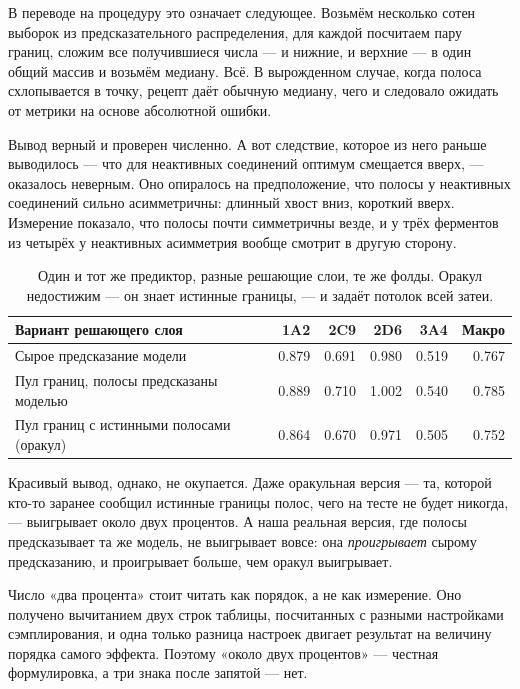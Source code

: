 В переводе на процедуру это означает следующее. Возьмём несколько сотен выборок из
предсказательного распределения, для каждой посчитаем пару границ, сложим все получившиеся
числа --- и нижние, и верхние --- в один общий массив и возьмём медиану. Всё. В вырожденном
случае, когда полоса схлопывается в точку, рецепт даёт обычную медиану, чего и следовало
ожидать от метрики на основе абсолютной ошибки.

Вывод верный и проверен численно. А вот следствие, которое из него раньше выводилось --- что
для неактивных соединений оптимум смещается вверх, --- оказалось неверным. Оно опиралось на
предположение, что полосы у неактивных соединений сильно асимметричны: длинный хвост вниз,
короткий вверх. Измерение показало, что полосы почти симметричны везде, и у трёх ферментов из
четырёх у неактивных асимметрия вообще смотрит в другую сторону.

\begin{table}[htbp]\centering\small
\begin{tabularx}{0.88\textwidth}{@{}Xrrrrr@{}}
\toprule
Вариант решающего слоя & 1A2 & 2C9 & 2D6 & 3A4 & Макро \\
\midrule
Сырое предсказание модели & 0.879 & 0.691 & 0.980 & 0.519 & 0.767 \\
Пул границ, полосы предсказаны моделью & 0.889 & 0.710 & 1.002 & 0.540 & 0.785 \\
Пул границ с истинными полосами (оракул) & 0.864 & 0.670 & 0.971 & 0.505 & 0.752 \\
\bottomrule
\end{tabularx}
\caption{Один и тот же предиктор, разные решающие слои, те же фолды. Оракул недостижим --- он
знает истинные границы, --- и задаёт потолок всей затеи.}
\label{tab:decision}
\end{table}

Красивый вывод, однако, не окупается. Даже оракульная версия --- та, которой
кто-то заранее сообщил истинные границы полос, чего на тесте не будет никогда, --- выигрывает
около двух процентов. А наша реальная версия, где полосы предсказывает та же модель, не
выигрывает вовсе: она \emph{проигрывает} сырому предсказанию, и проигрывает больше, чем оракул
выигрывает.

Число «два процента» стоит читать как порядок, а не как измерение. Оно получено вычитанием двух
строк таблицы, посчитанных с разными настройками сэмплирования, и одна только разница настроек
двигает результат на величину порядка самого эффекта. Поэтому «около двух процентов» --- честная
формулировка, а три знака после запятой --- нет.

